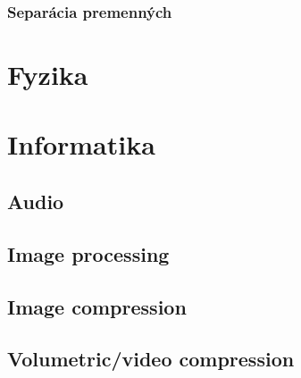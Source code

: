         \subsubsection{Separácia premenných}
    
         
\section{Fyzika}
    
    
    
    
\section{Informatika}
    
    \subsection{Audio}
    \subsection{Image processing}
    \subsection{Image compression}
    \subsection{Volumetric/video compression}
     
